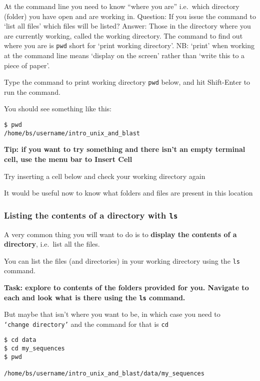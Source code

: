 \documentclass[11pt]{article}
\begin{document}
At the command line you need to know ``where you are'' i.e.~which
directory (folder) you have open and are working in. Question: If you
issue the command to `list all files' which files will be listed?
Answer: Those in the directory where you are currently working, called
the working directory. The command to find out where you are is
\texttt{pwd} short for `print working directory'. NB: `print' when
working at the command line means `display on the screen' rather than
`write this to a piece of paper'.

Type the command to print working directory \texttt{pwd} below, and hit
Shift-Enter to run the command.

    You should see something like this:

\begin{verbatim}
$ pwd
/home/bs/username/intro_unix_and_blast
\end{verbatim}

    \textbf{Tip: if you want to try something and there isn't an empty
terminal cell, use the menu bar to Insert Cell}

Try inserting a cell below and check your working directory again

    It would be useful now to know what folders and files are present in
this location

    \hypertarget{listing-the-contents-of-a-directory-with-ls}{%
\subsubsection{\texorpdfstring{Listing the contents of a directory with
\texttt{ls}}{Listing the contents of a directory with ls}}\label{listing-the-contents-of-a-directory-with-ls}}

A very common thing you will want to do is to \textbf{display the
contents of a directory}, i.e.~list all the files.

You can list the files (and directories) in your working directory using
the \texttt{ls} command.

\textbf{Task: explore to contents of the folders provided for you.
Navigate to each and look what is there using the \texttt{ls} command.}

    But maybe that isn't where you want to be, in which case you need to
\texttt{‘change\ directory’} and the command for that is \texttt{cd}

\begin{verbatim}
$ cd data
$ cd my_sequences
$ pwd

/home/bs/username/intro_unix_and_blast/data/my_sequences
\end{verbatim}
\end{document}
